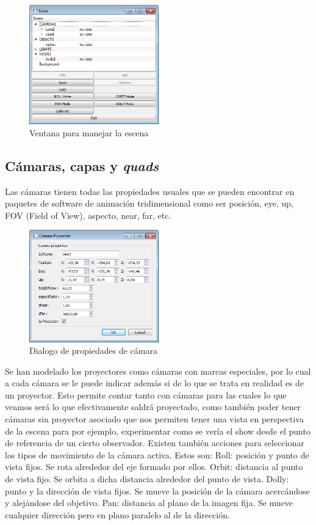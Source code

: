 \begin{figure}[H]
  \centering
    \includegraphics[width=0.5\textwidth]{./Cap5_vmt/vmt_scene.png}
  \caption{Ventana para manejar la escena}
  \label{fig:VMT-SceneWindow}
\end{figure}

\subsection{Cámaras, capas y \emph{quads}}
Las cámaras tienen todas las propiedades usuales que se pueden encontrar en paquetes de software de animación tridimensional como ser posición, eye, up, FOV (Field of View), aspecto, near, far, etc.

\begin{figure}[H]
  \centering
    \includegraphics[width=0.5\textwidth]{./Cap5_vmt/vmt_cameraProperties.png}
  \caption{Dialogo de propiedades de cámara}
  \label{fig:VMT-CameraProperties}
\end{figure}

Se han modelado los proyectores como cámaras con marcas especiales, por lo cual a cada cámara se le puede indicar además si de lo que se trata en realidad es de un proyector. Esto permite contar tanto con cámaras para las cuales lo que veamos será lo que efectivamente saldrá proyectado, como también poder tener cámaras sin proyector asociado que nos permiten tener una vista en perspectiva de la escena para por ejemplo, experimentar como se vería el show desde el punto de referencia de un cierto observador.
Existen también acciones para seleccionar los tipos de movimiento de la cámara activa. Estos son:
Roll: posición y punto de vista fijos. Se rota alrededor del eje formado por ellos.
Orbit: distancia al punto de vista fijo. Se orbita a dicha distancia alrededor del punto de vista.
Dolly: punto y la dirección de vista fijos. Se mueve la posición de la cámara acercándose y alejándose del objetivo.
Pan: distancia al plano de la imagen fija. Se mueve cualquier dirección pero en plano paralelo al de la dirección.

